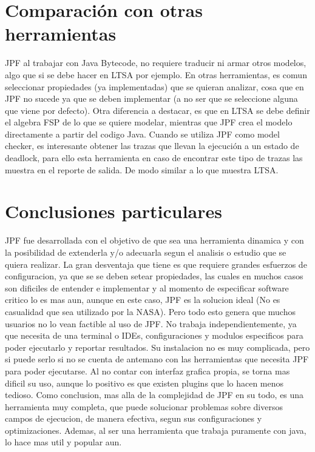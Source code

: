 \documentclass[runningheads]{llncs}
\begin{document}
\section{Comparaci\'on con otras herramientas}

JPF al trabajar con Java Bytecode, no requiere traducir ni armar otros modelos, algo que si se debe hacer en LTSA por ejemplo. En otras herramientas, es comun seleccionar propiedades (ya implementadas) que se quieran analizar, cosa que en JPF no sucede ya que se deben implementar (a no ser que se seleccione alguna que viene por defecto).
Otra diferencia a destacar, es que en LTSA se debe definir el algebra FSP de lo que se quiere modelar, mientras que JPF crea el modelo directamente a partir del codigo Java.
Cuando se utiliza JPF como model checker, es interesante obtener las trazas que llevan la ejecuci\'on a un estado de deadlock, para ello esta herramienta en caso de encontrar este tipo de trazas las muestra en el reporte de salida. De modo similar a lo que muestra LTSA.


\section{Conclusiones particulares}

JPF fue desarrollada con el objetivo de que sea una herramienta dinamica y con la posibilidad de extenderla y/o adecuarla segun el analisis o estudio que se quiera realizar. La gran desventaja que tiene es que requiere grandes esfuerzos de configuracion, ya que se se deben setear propiedades, las cuales en muchos casos son dificiles de entender e implementar y al momento de especificar software critico lo es mas aun, aunque en este caso, JPF es la solucion ideal (No es casualidad que sea utilizado por la NASA). Pero todo esto genera que muchos usuarios no lo vean factible al uso de JPF.
No trabaja independientemente, ya que necesita de una terminal o IDEs, configuraciones y modulos especificos para poder ejecutarlo y reportar resultados. Su instalacion no es muy complicada, pero si puede serlo si no se cuenta de antemano con las herramientas que necesita JPF para poder ejecutarse. Al no contar con interfaz grafica propia, se torna mas dificil su uso, aunque lo positivo es que existen plugins que lo hacen menos tedioso.
Como conclusion, mas alla de la complejidad de JPF en su todo, es una herramienta muy completa, que puede solucionar problemas sobre diversos campos de ejecucion, de manera efectiva, segun sus configuraciones y optimizaciones. Ademas, al ser una herramienta que trabaja puramente con java, lo hace mas util y popular aun.
\end{document}
